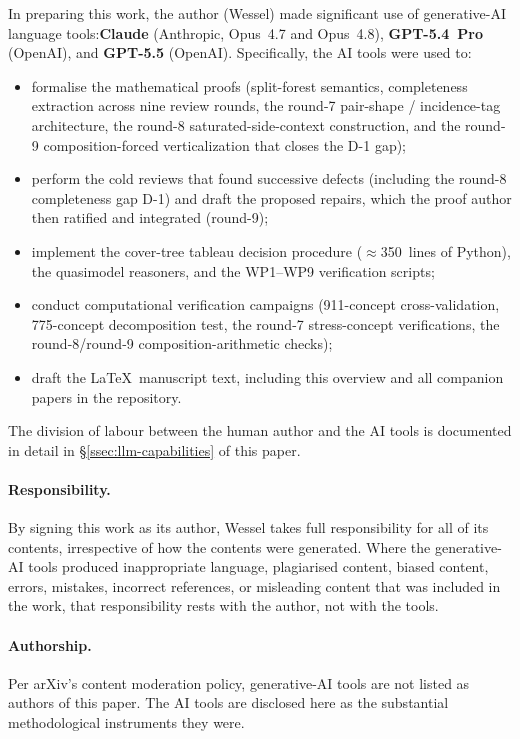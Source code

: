 \documentclass[
]{ceurart}
\theoremstyle{definition}
\begin{document}
In preparing this work, the author (Wessel) made significant use of
generative-AI language tools:\@ \textbf{Claude} (Anthropic, Opus~4.7
and Opus~4.8), \textbf{GPT-5.4~Pro} (OpenAI), and \textbf{GPT-5.5}
(OpenAI).  Specifically, the AI tools were used to:
\begin{itemize}
\item formalise the mathematical proofs (split-forest semantics,
  completeness extraction across nine review rounds, the round-7
  pair-shape / incidence-tag architecture, the round-8
  saturated-side-context construction, and the round-9
  composition-forced verticalization that closes the D-1 gap);
\item perform the cold reviews that found successive defects
  (including the round-8 completeness gap D-1) and draft the
  proposed repairs, which the proof author then ratified and
  integrated (round-9);
\item implement the cover-tree tableau decision procedure
  ($\approx$350~lines of Python), the quasimodel reasoners, and
  the WP1--WP9 verification scripts;
\item conduct computational verification campaigns (911-concept
  cross-validation, 775-concept decomposition test, the round-7
  stress-concept verifications, the round-8/round-9
  composition-arithmetic checks);
\item draft the \LaTeX\ manuscript text, including this overview
  and all companion papers in the repository.
\end{itemize}
The division of labour between the human author and the AI tools
is documented in detail in \S\ref{ssec:llm-capabilities} of this
paper.

\paragraph{Responsibility.}  By signing this work as its author,
Wessel takes full responsibility for all of its contents,
irrespective of how the contents were generated.  Where the
generative-AI tools produced inappropriate language, plagiarised
content, biased content, errors, mistakes, incorrect references,
or misleading content that was included in the work, that
responsibility rests with the author, not with the tools.

\paragraph{Authorship.}  Per arXiv's content moderation policy,
generative-AI tools are not listed as authors of this paper.
The AI tools are disclosed here as the substantial methodological
instruments they were.
\end{document}
